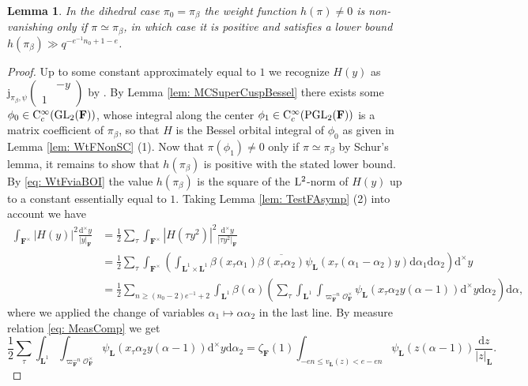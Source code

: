 \documentclass[A4]{amsart}
\def\leq{\leqslant}
\def\geq{\geqslant}
\newtheorem{lemma}      [theorem]{Lemma}
\numberwithin{equation}{section} \everymath{\displaystyle}
\newcommand{\Cont}{{\rm C}}
\newcommand{\intL}{{\rm L}}
\newcommand{\GL}{{\rm GL}}
\newcommand{\PGL}{{\rm PGL}}
\newcommand{\ud}{\mathrm{d}}
\newcommand{\F}{\mathbf{F}}
\newcommand{\bL}{\mathbf{L}}
\newcommand{\vO}{\mathcal{O}}
\newcommand{\norm}[1][\cdot]{\lvert #1 \rvert}
\newcommand{\extnorm}[1]{\left\lvert #1 \right\rvert}
\newcommand{\BesselF}{\mathrm{j}}
\begin{document}
\begin{lemma} \label{lem: WtFSC}
	In the dihedral case $\pi_0=\pi_{\beta}$ the weight function $h(\pi) \neq 0$ is non-vanishing only if $\pi \simeq \pi_{\beta}$, in which case it is positive and satisfies a lower bound $h(\pi_{\beta}) \gg q^{-e^{-1}n_0+1-e}$.
\end{lemma}
\begin{proof}
	Up to some constant approximately equal to $1$ we recognize $H(y)$ as $\BesselF_{\pi_{\beta},\psi} \begin{pmatrix} & -y \\ 1 & \end{pmatrix}$ by \cite[Theorem 1.1]{BS11}. By Lemma \ref{lem: MCSuperCuspBessel} there exists some $\phi_0 \in \Cont_c^{\infty}(\GL_2(\F))$, whose integral along the center $\phi_1 \in \Cont_c^{\infty}(\PGL_2(\F))$ is a matrix coefficient of $\pi_{\beta}$, so that $H$ is the Bessel orbital integral of $\phi_0$ as given in Lemma \ref{lem: WtFNonSC} (1). Now that $\pi(\phi_1) \neq 0$ only if $\pi \simeq \pi_{\beta}$ by Schur's lemma, it remains to show that $h(\pi_{\beta})$ is positive with the stated lower bound. By \eqref{eq: WtFviaBOI} the value $h(\pi_{\beta})$ is the square of the $\intL^2$-norm of $H(y)$ up to a constant essentially equal to $1$. Taking Lemma \ref{lem: TestFAsymp} (2) into account we have
\begin{align*}
	\int_{\F^{\times}} \extnorm{H(y)}^2 \tfrac{\ud^{\times} y}{\norm[y]_{\F}} &= \frac{1}{2} \sum_{\tau} \int_{\F^{\times}} \extnorm{H(\tau y^2)}^2 \tfrac{\ud^{\times} y}{\norm[\tau y^2]_{\F}} \\
	&= \frac{1}{2} \sum_{\tau} \int_{\F^{\times}} \left( \int_{\bL^1 \times \bL^1} \beta(x_{\tau}\alpha_1) \overline{\beta(x_{\tau} \alpha_2)} \psi_{\bL}(x_{\tau}(\alpha_1-\alpha_2)y) \ud \alpha_1 \ud \alpha_2 \right) \ud^{\times} y \\
	&= \frac{1}{2} \sum_{n \geq (n_0-2)e^{-1}+2} \int_{\bL^1} \beta(\alpha) \left( \sum_{\tau} \int_{\bL^1} \int_{\varpi_{\F}^{-n} \vO_{\F}^{\times}} \psi_{\bL}(x_{\tau}\alpha_2 y(\alpha-1)) \ud^{\times} y \ud \alpha_2 \right) \ud \alpha,
\end{align*}
	where we applied the change of variables $\alpha_1 \mapsto \alpha \alpha_2$ in the last line. By measure relation \eqref{eq: MeasComp} we get
	$$ \frac{1}{2} \sum_{\tau} \int_{\bL^1} \int_{\varpi_{\F}^{-n} \vO_{\F}^{\times}} \psi_{\bL}(x_{\tau}\alpha_2 y(\alpha-1)) \ud^{\times} y \ud \alpha_2 = \zeta_{\F}(1) \int_{-en \leq v_{\bL}(z) < e-en} \psi_{\bL}(z(\alpha-1)) \frac{\ud z}{\norm[z]_{\bL}}. $$

\end{proof}
\end{document}

